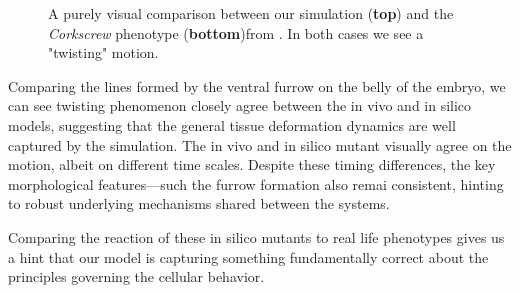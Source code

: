  
\begin{figure}[H]
    \centering
    \caption{A purely visual comparison between our simulation (\textbf{top}) and the \textit{Corkscrew} phenotype (\textbf{bottom})from . In both cases we see a "twisting" motion.}
    \label{fig:corkscrew-comparison}
\end{figure}

Comparing the lines formed by the ventral furrow on the belly of the embryo, we can see twisting phenomenon closely agree between the in vivo and in silico models, suggesting that the general tissue deformation dynamics are well captured by the simulation. The in vivo and in silico mutant visually agree on the motion, albeit on different time scales. Despite these timing differences, the key morphological features—such the furrow formation also remai consistent, hinting to robust underlying mechanisms shared between the systems.


Comparing the reaction of these in silico mutants to real life phenotypes gives us a hint that our model is capturing something fundamentally correct about the principles governing the cellular behavior. 



